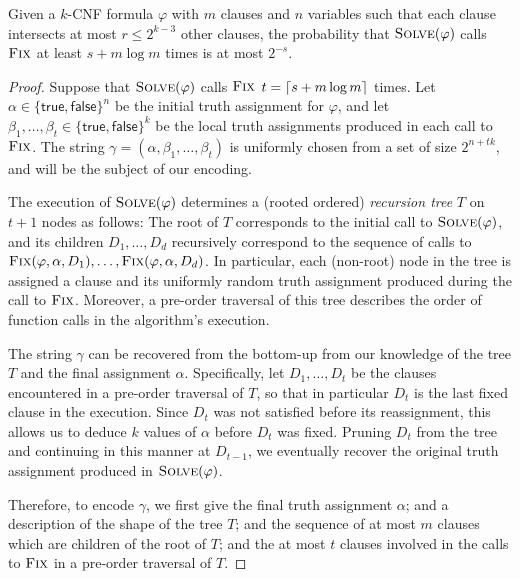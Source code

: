 \documentclass{patmorin}
\begin{document}
\begin{thm}
%
  Given a $k$-CNF formula $\varphi$ with $m$ clauses and $n$ variables
  such that each clause intersects at most $r \le 2^{k - 3}$ other
  clauses, the probability that $\textsc{Solve}(\varphi)$ calls
  $\textsc{Fix}$ at least $s + m \log m$ times is at most $2^{-s}$.
\end{thm}
\begin{proof}
  Suppose that $\textsc{Solve}(\varphi)$ calls $\textsc{Fix}$
  $t = {\lceil s + m\log m \rceil}$ times. Let
  $\alpha \in \{\textsf{true}, \textsf{false}\}^n$ be the initial
  truth assignment for $\varphi$, and let
  $\beta_1, \ldots, \beta_t \in \{\textsf{true}, \textsf{false}\}^k$
  be the local truth assignments produced in each call to
  $\textsc{Fix}$. The string
  $\gamma = (\alpha, \beta_1, \ldots, \beta_t)$ is uniformly chosen
  from a set of size $2^{n + tk}$, and will be the subject of our
  encoding.

  The execution of $\textsc{Solve}(\varphi)$ determines a (rooted
  ordered) \emph{recursion tree} $T$ on $t + 1$ nodes as follows: The
  root of $T$ corresponds to the initial call to
  $\textsc{Solve}(\varphi)$, and its children $D_1, \ldots, D_d$
  recursively correspond to the sequence of calls to
  $\textsc{Fix}(\varphi, \alpha, D_1), \ldots, \textsc{Fix}(\varphi,
  \alpha, D_d)$. In particular, each (non-root) node in the tree is
  assigned a clause and its uniformly random truth assignment produced
  during the call to $\textsc{Fix}$. Moreover, a pre-order traversal
  of this tree describes the order of function calls in the
  algorithm's execution.

  The string $\gamma$ can be recovered from the bottom-up from our
  knowledge of the tree $T$ and the final assignment
  $\alpha$. Specifically, let $D_1, \dots, D_t$ be the clauses
  encountered in a pre-order traversal of $T$, so that in particular
  $D_t$ is the last fixed clause in the execution. Since $D_t$ was not
  satisfied before its reassignment, this allows us to deduce $k$
  values of $\alpha$ before $D_t$ was fixed. Pruning $D_t$ from the
  tree and continuing in this manner at $D_{t - 1}$, we eventually
  recover the original truth assignment produced in
  $\textsc{Solve}(\varphi)$.

  Therefore, to encode $\gamma$, we first give the final truth
  assignment $\alpha$; and a description of the shape of the tree $T$;
  and the sequence of at most $m$ clauses which are children of the
  root of $T$; and the at most $t$ clauses involved in the calls to
  $\textsc{Fix}$ in a pre-order traversal of $T$.


\end{proof}
\end{document}
